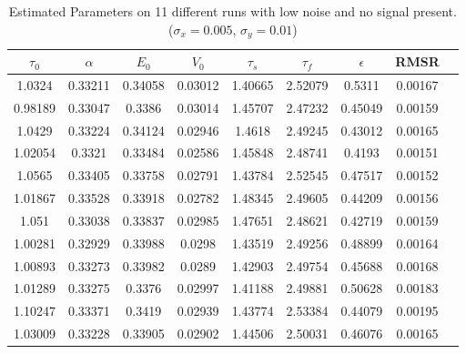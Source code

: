 \begin{table}[t]
\centering
\begin{tabular}{|c | c | c | c | c | c | c | c | c |}
\hline
$\tau_0$ & $\alpha$ & $E_0$    & $V_0$    & $\tau_s$ & $\tau_f$ & $\epsilon$  & \acs{RMSR} \\
\hline
1.0324 & 0.33211 & 0.34058 & 0.03012 & 1.40665 & 2.52079 & 0.5311 &   0.00167  \\
 0.98189 & 0.33047 & 0.3386 & 0.03014 & 1.45707 & 2.47232 & 0.45049 & 0.00159   \\
 1.0429 & 0.33224 & 0.34124 & 0.02946 & 1.4618 & 2.49245 & 0.43012 &  0.00165   \\
 1.02054 & 0.3321 & 0.33484 & 0.02586 & 1.45848 & 2.48741 & 0.4193 &  0.00151   \\
 1.0565 & 0.33405 & 0.33758 & 0.02791 & 1.43784 & 2.52545 & 0.47517 & 0.00152   \\
 1.01867 & 0.33528 & 0.33918 & 0.02782 & 1.48345 & 2.49605 & 0.44209 &0.00156   \\
 1.051 & 0.33038 & 0.33837 & 0.02985 & 1.47651 & 2.48621 & 0.42719 &  0.00159   \\
 1.00281 & 0.32929 & 0.33988 & 0.0298 & 1.43519 & 2.49256 & 0.48899 & 0.00164   \\
 1.00893 & 0.33273 & 0.33982 & 0.0289 & 1.42903 & 2.49754 & 0.45688 & 0.00168   \\
 1.01289 & 0.33275 & 0.3376 & 0.02997 & 1.41188 & 2.49881 & 0.50628 & 0.00183   \\
 1.10247 & 0.33371 & 0.3419 & 0.02939 & 1.43774 & 2.53384 & 0.44079 & 0.00195   \\
\hline
1.03009 & 0.33228 & 0.33905 & 0.02902 & 1.44506 & 2.50031 & 0.46076 & 0.00165 \\
\hline
\end{tabular}
\caption{Estimated Parameters on 11 different runs with low noise and no signal present.
 ($\sigma_x = 0.005$, $\sigma_y = 0.01$)}
\label{tab:NoiseOnlyResults}
\end{table}

